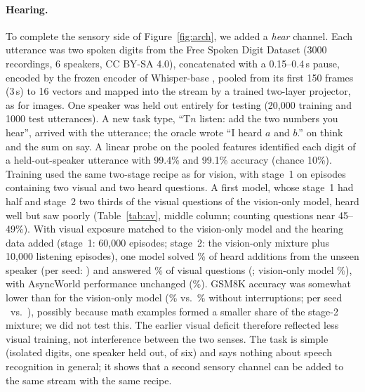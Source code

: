 \documentclass[10pt]{article}
\begin{document}
\paragraph{Hearing.} To complete the sensory side of Figure~\ref{fig:arch}, we added a \emph{hear} channel. Each utterance was two spoken digits from the Free Spoken Digit Dataset \citep{jackson2018fsdd} (3000 recordings, 6 speakers, CC BY-SA 4.0), concatenated with a 0.15--0.4\,s pause, encoded by the frozen encoder of Whisper-base \citep{radford2023whisper}, pooled from its first 150 frames (3\,s) to 16 vectors and mapped into the stream by a trained two-layer projector, as for images. One speaker was held out entirely for testing (20{,}000 training and 1000 test utterances). A new task type, ``T$n$ listen: add the two numbers you hear'', arrived with the utterance; the oracle wrote ``I heard $a$ and $b$.'' on think and the sum on say. A linear probe on the pooled features identified each digit of a held-out-speaker utterance with 99.4\% and 99.1\% accuracy (chance 10\%). Training used the same two-stage recipe as for vision, with stage~1 on episodes containing two visual and two heard questions. A first model, whose stage~1 had half and stage~2 two thirds of the visual questions of the vision-only model, heard well but saw poorly (Table~\ref{tab:av}, middle column; counting questions near 45--49\%). With visual exposure matched to the vision-only model and the hearing data added (stage~1: 60{,}000 episodes; stage~2: the vision-only mixture plus 10{,}000 listening episodes), one model solved \avavmlisten\% of heard additions from the unseen speaker (per seed: \avavmlistenseeds) and answered \avavmvis\% of visual questions (\avavmvisseeds; vision-only model \avmmvvis\%), with AsyncWorld performance unchanged (\avavmid\%). GSM8K accuracy was somewhat lower than for the vision-only model (\avavmsolo\% vs.\ \avmmvsolo\% without interruptions; per seed \avavmsoloseeds\ vs.\ \avmmvsoloseeds), possibly because math examples formed a smaller share of the stage-2 mixture; we did not test this. The earlier visual deficit therefore reflected less visual training, not interference between the two senses. The task is simple (isolated digits, one speaker held out, of six) and says nothing about speech recognition in general; it shows that a second sensory channel can be added to the same stream with the same recipe.

\begin{table}[t]
\centering\small
\caption{Seeing and hearing in one stream. Accuracy in \%, pooled over the seeds shown (GSM8K rows use the seeds available for that split), bootstrap 95\% CI over items. Heard additions: 600 per seed, speaker unseen in training. Middle: first see+hear model, trained with fewer visual examples; right: visual exposure matched to the see-only model.}
\label{tab:av}
\resizebox{\linewidth}{!}{}
\end{table}
\end{document}
